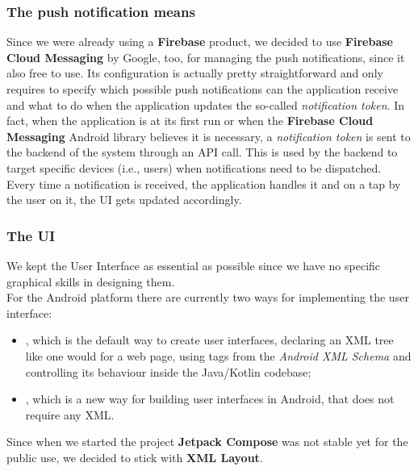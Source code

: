 \documentclass[../../main]{subfiles}
\begin{document}
\subsubsection{The push notification means}
Since we were already using a \textbf{Firebase} product, we decided to use \textbf{Firebase Cloud Messaging} by Google, too, for managing the push notifications, since it also free to use.
Its configuration is actually pretty straightforward and only requires to specify which possible push notifications can the application receive and what to do when the application updates the so-called \textit{notification token}.
In fact, when the application is at its first run or when the \textbf{Firebase Cloud Messaging} Android library believes it is necessary, a \textit{notification token} is sent to the backend of the system through an API call.
This is used by the backend to target specific devices (i.e., users) when notifications need to be dispatched.
Every time a notification is received, the application handles it and on a tap by the user on it, the UI gets updated accordingly.

\subsubsection{The UI}
We kept the User Interface as essential as possible since we have no specific graphical skills in designing them.\\
For the Android platform there are currently two ways for implementing the user interface:
\begin{itemize}
    \item {}, which is the default way to create user interfaces, declaring an XML tree like one would for a web page, using tags from the \textit{Android XML Schema} and controlling its behaviour inside the Java/Kotlin codebase;
    \item {}, which is a new way for building user interfaces in Android, that does not require any XML.
\end{itemize}
Since when we started the project \textbf{Jetpack Compose} was not stable yet for the public use, we decided to stick with \textbf{XML Layout}.
\end{document}
